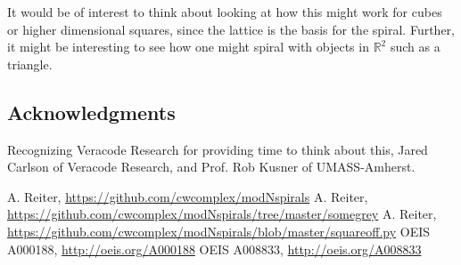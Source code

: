 \documentclass[11pt]{amsart}
\theoremstyle{mydef}
\begin{document}
It would be of interest to think about looking at how this might work for cubes or higher dimensional squares, since the lattice is the basis for the spiral. Further, it might be interesting to see how one might spiral with objects in $\mathbb{R}^2$ such as a triangle.
\subsection{Acknowledgments}
Recognizing Veracode Research for providing time to think about this, Jared Carlson of Veracode Research, and Prof. Rob Kusner of UMASS-Amherst.

\begin{thebibliography}{1}
 A. Reiter, \url{https://github.com/cwcomplex/modNspirals}
 A. Reiter, \url{https://github.com/cwcomplex/modNspirals/tree/master/somegrey}
 A. Reiter, \url{https://github.com/cwcomplex/modNspirals/blob/master/squareoff.py}
 OEIS A000188, \url{http://oeis.org/A000188}
 OEIS A008833, \url{http://oeis.org/A008833}

\end{thebibliography}
\end{document}
